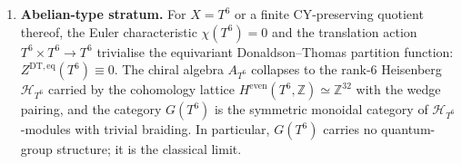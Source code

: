 \begin{conjecture}
\begin{enumerate}[label=\textup{(\roman*)}]
 the $\rho$-stratification of
 Theorem~\ref{thm:cy-c-six-routes-generator-level-convergence}. The
 $\kappa_{\mathrm{BKM}}$ weight is $c_N(0)/2 = 5$ at $N = 1$
 (unnormalised Igusa square \(\Phi_{10}^{\mathrm{un}}\),
 Borcherds weight theorem).
 \item \textbf{Abelian-type stratum.} For $X = T^6$ or a finite CY-preserving quotient
 thereof, the Euler characteristic $\chi(T^6) = 0$ and the translation action
 $T^6 \times T^6 \to T^6$ trivialise the equivariant Donaldson--Thomas partition
 function: $Z^{\mathrm{DT}, \mathrm{eq}}(T^6) \equiv 0$. The chiral algebra
 $A_{T^6}$ collapses to the rank-$6$ Heisenberg $\mathcal{H}_{T^6}$ carried by the
 cohomology lattice $H^{\mathrm{even}}(T^6, \mathbb{Z}) \simeq \mathbb{Z}^{32}$
 with the wedge pairing, and the category $G(T^6)$ is the symmetric monoidal
 category of $\mathcal{H}_{T^6}$-modules with trivial braiding. In particular,
 $G(T^6)$ carries no quantum-group structure; it is the classical limit.
\end{enumerate}
\end{conjecture}

